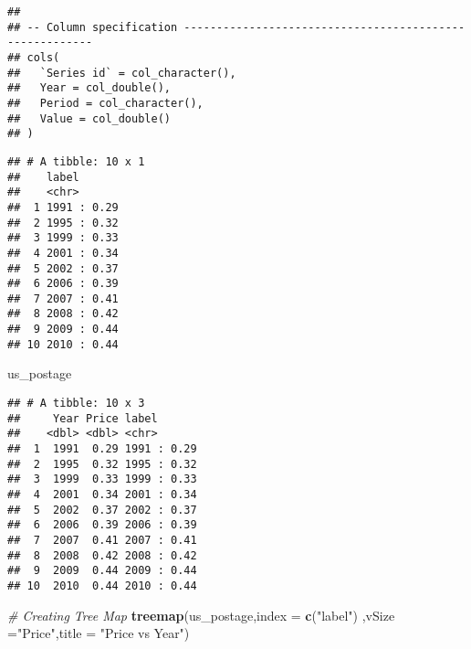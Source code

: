 \documentclass[
]{article}
\newenvironment{Shaded}{\begin{snugshade}}{\end{snugshade}}
\newcommand{\CommentTok}[1]{\textcolor[rgb]{0.56,0.35,0.01}{\textit{#1}}}
\newcommand{\DataTypeTok}[1]{\textcolor[rgb]{0.13,0.29,0.53}{#1}}
\newcommand{\KeywordTok}[1]{\textcolor[rgb]{0.13,0.29,0.53}{\textbf{#1}}}
\newcommand{\NormalTok}[1]{#1}
\newcommand{\OperatorTok}[1]{\textcolor[rgb]{0.81,0.36,0.00}{\textbf{#1}}}
\newcommand{\StringTok}[1]{\textcolor[rgb]{0.31,0.60,0.02}{#1}}
\begin{document}
\begin{verbatim}
## 
## -- Column specification --------------------------------------------------------
## cols(
##   `Series id` = col_character(),
##   Year = col_double(),
##   Period = col_character(),
##   Value = col_double()
## )
\end{verbatim}

\begin{Shaded}
\end{Shaded}

\begin{verbatim}
## # A tibble: 10 x 1
##    label      
##    <chr>      
##  1 1991 : 0.29
##  2 1995 : 0.32
##  3 1999 : 0.33
##  4 2001 : 0.34
##  5 2002 : 0.37
##  6 2006 : 0.39
##  7 2007 : 0.41
##  8 2008 : 0.42
##  9 2009 : 0.44
## 10 2010 : 0.44
\end{verbatim}

\begin{Shaded}
\begin{Highlighting}[]
\NormalTok{us_postage}
\end{Highlighting}
\end{Shaded}

\begin{verbatim}
## # A tibble: 10 x 3
##     Year Price label      
##    <dbl> <dbl> <chr>      
##  1  1991  0.29 1991 : 0.29
##  2  1995  0.32 1995 : 0.32
##  3  1999  0.33 1999 : 0.33
##  4  2001  0.34 2001 : 0.34
##  5  2002  0.37 2002 : 0.37
##  6  2006  0.39 2006 : 0.39
##  7  2007  0.41 2007 : 0.41
##  8  2008  0.42 2008 : 0.42
##  9  2009  0.44 2009 : 0.44
## 10  2010  0.44 2010 : 0.44
\end{verbatim}

\begin{Shaded}
\begin{Highlighting}[]
\CommentTok{# Creating Tree Map}
\KeywordTok{treemap}\NormalTok{(us_postage,}\DataTypeTok{index =} \KeywordTok{c}\NormalTok{(}\StringTok{"label"}\NormalTok{) ,}\DataTypeTok{vSize =}\StringTok{"Price"}\NormalTok{,}\DataTypeTok{title =} \StringTok{"Price vs Year"}\NormalTok{)}
\end{Highlighting}
\end{Shaded}
\end{document}
